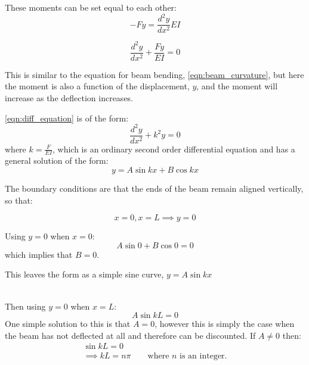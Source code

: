 These moments can be  set equal to each other:
\begin{equation}
-Fy = \frac{d^2y}{dx^2}EI \label{eqn:diff_equation}
\end{equation}
\begin{annotation}
\begin{equation}
\frac{d^2y}{dx^2} + \frac{Fy}{EI} = 0
\end{equation}
\end{annotation}

This is similar to the equation for beam bending, \autoref{eqn:beam_curvature}, but here the moment is also a function of the displacement, $y$, and the moment will increase as the deflection increases.

\autoref{eqn:diff_equation} is of the form:
\begin{equation}
\frac{d^2y}{dx^2} + k^2y = 0
\end{equation}
where $k=\frac{F}{EI}$, which is an ordinary second order differential equation and has a general solution of the form:
\begin{equation}
y = A\sin kx + B \cos kx
\end{equation}


The boundary conditions are that the ends of the beam remain aligned vertically, so that:

\begin{equation}
x=0, x=L \implies y = 0
\end{equation}

Using $y=0$ when $x=0$:
\begin{equation}
A \sin 0 + B \cos 0 = 0
\end{equation}
which implies that $B=0$. \begin{annotation} This leaves the form as a simple sine curve, $y=A\sin kx$ \end{annotation}
\\

Then using $y=0$ when $x=L$:
\begin{equation}
A \sin kL = 0
\end{equation}
One simple solution to this is that $A=0$, however this is simply the case when the beam has not deflected at all and therefore can be discounted. If $A \neq 0$ then:
\begin{align}
\sin kL = 0 \\
\implies kL = n\pi \qquad \text{where} \,\, n \,\, \text{is an integer.}\nonumber
\end{align}

